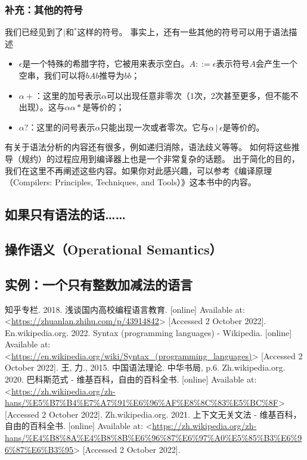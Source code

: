 \documentclass[../main.tex]{subfiles}
\begin{document}
  \subsubsection*{补充：其他的符号}
    \indent 我们已经见到了$|$和${}^*$这样的符号。
    事实上，还有一些其他的符号可以用于语法描述

    \begin{itemize}
      \item $\epsilon$是一个特殊的希腊字符，它被用来表示空白。$A ::= \epsilon$表示符号$A$会产生一个空串，我们可以将$bAb$推导为$bb$；
      \item $\alpha+$：这里的加号表示$\alpha$可以出现任意非零次（1次，2次甚至更多，但不能不出现）。这与$\alpha\alpha*$是等价的；
      \item $\alpha?$：这里的问号表示$\alpha$只能出现一次或者零次。它与$\alpha\,|\,\epsilon$是等价的。
    \end{itemize}

    \indent 

  \indent 有关于语法分析的内容还有很多，例如递归消除，语法歧义等等。
  如何将这些推导（规约）的过程应用到编译器上也是一个非常复杂的话题。
  出于简化的目的，我们在这里不再阐述这些内容。如果你对此感兴趣，可以参考《编译原理（Compilers: Principles, Techniques, and Tools）》这本书中的内容。

  \subsection{如果只有语法的话……}

  \subsection{操作语义（Operational Semantics）}

  \subsection{实例：一个只有整数加减法的语言}

  \begin{thebibliography}{5}
     知乎专栏. 2018. 浅谈国内高校编程语言教育. [online] Available at: <\url{https://zhuanlan.zhihu.com/p/43914842}> [Accessed 2 October 2022].
     En.wikipedia.org. 2022. Syntax (programming languages) - Wikipedia. [online] Available at: <\url{https://en.wikipedia.org/wiki/Syntax_(programming_languages)}> [Accessed 2 October 2022].
     王, 力., 2015. 中国语法理论. 中华书局, p.6.
     Zh.wikipedia.org. 2020. 巴科斯范式 - 维基百科，自由的百科全书. [online] Available at: <\url{https://zh.wikipedia.org/zh-hans/%E5%B7%B4%E7%A7%91%E6%96%AF%E8%8C%83%E5%BC%8F}> [Accessed 2 October 2022]. 
     Zh.wikipedia.org. 2021. 上下文无关文法 - 维基百科，自由的百科全书. [online] Available at: <\url{https://zh.wikipedia.org/zh-hans/%E4%B8%8A%E4%B8%8B%E6%96%87%E6%97%A0%E5%85%B3%E6%96%87%E6%B3%95}> [Accessed 2 October 2022].
  \end{thebibliography}
\end{document}
